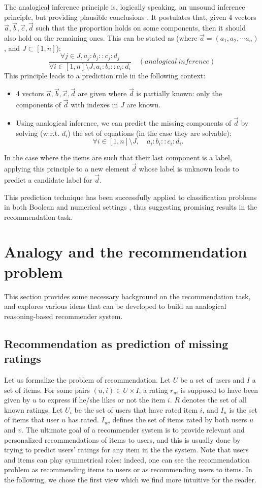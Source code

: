 \documentclass[conference]{IEEEtran}
\begin{document}
The analogical inference principle is, logically speaking, an unsound inference principle, but providing plausible conclusions \cite{PradeR10}.
It postulates that, given 4 vectors
$\vec{a},\vec{b},\vec{c}, \vec{d}$
such that the proportion holds  on some components, then it should also hold on the
remaining ones.  This can be stated as (where $\vec{a} = (a_1, a_2, \cdots
a_n)$, and $J \subset [1,n]$): $$\frac{\forall j \in J,
a_j:b_j::c_j:d_j}{\forall i \in [1,n] \setminus J, a_i:b_i::c_i:d_i} \quad
(analogical ~ inference)$$
\noindent
This principle leads to a prediction rule in the following context:
\begin{itemize}
\item 4 vectors $\vec{a},\vec{b},\vec{c},
\vec{d}$ are given where $\vec{d}$ is partially known: only the
components of $\vec{d}$ with indexes in $J$ are known.
\item Using analogical inference, we can
predict the missing components of $\vec{d}$ by solving (w.r.t. $d_i$) the set of
equations (in the case they are solvable): $$\forall i \in [1,n]
\setminus J, \quad a_i:b_i::c_i:d_i.$$
\end{itemize}
In the case where the items are such that their last component is a label,
applying this principle to a new element $\vec{d}$ whose label is
unknown leads to predict a candidate label for $\vec{d}$.

This prediction technique has been successfully applied to classification
problems in both Boolean \cite{BayMicDel2007} and numerical settings \cite{PraRicYaoIJCISIM2012}, 
thus suggesting promising results
in the recommendation task.

\section{Analogy and the recommendation problem}
This section provides some necessary background on the recommendation task, and
explores various ideas that can be developed to build an analogical
reasoning-based recommender system.

\subsection{Recommendation as prediction of missing ratings}
Let us formalize the problem of recommendation.
Let $U$ be a set of users and $I$ a set of items. For some pairs $(u,i) \in U
\times I$, a rating  $r_{ui}$ is supposed to have been given by $u$ to express
if he/she likes or not the item $i$. $R$ denotes the set of all known ratings.
Let $U_i$ be the set of users that have rated item $i$, and $I_u$ is the set of
items that user $u$ has rated. $I_{uv}$ defines the set of items rated by both
users $u$ and $v$. The ultimate goal of a recommender system is to provide
relevant and personalized recommendations of items to users, and this is
usually done by trying to predict users' ratings for any item in the the
system. Note that users and items can play symmetrical roles: indeed, one can see the recommendation problem as recommending items to users or as recommending users to items. In the following, we chose the first view which we find more intuitive for the reader.
\end{document}
